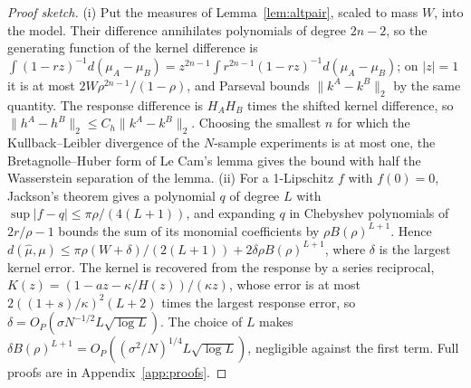 \documentclass[12pt]{article}
\theoremstyle{definition}
\theoremstyle{remark}
\begin{document}
\begin{proof}[Proof sketch]
(i) Put the measures of Lemma~\ref{lem:altpair}, scaled to mass $W$, into the model. Their difference annihilates polynomials of degree $2n-2$, so the generating function of the kernel difference is $\int(1-rz)^{-1}d(\mu_A-\mu_B)=z^{2n-1}\int r^{2n-1}(1-rz)^{-1}d(\mu_A-\mu_B)$; on $|z|=1$ it is at most $2W\rho^{2n-1}/(1-\rho)$, and Parseval bounds $\|k^A-k^B\|_2$ by the same quantity. The response difference is $H_AH_B$ times the shifted kernel difference, so $\|h^A-h^B\|_2\le C_h\|k^A-k^B\|_2$. Choosing the smallest $n$ for which the Kullback--Leibler divergence of the $N$-sample experiments is at most one, the Bretagnolle--Huber form of Le Cam's lemma gives the bound with half the Wasserstein separation of the lemma. (ii) For a 1-Lipschitz $f$ with $f(0)=0$, Jackson's theorem gives a polynomial $q$ of degree $L$ with $\sup|f-q|\le\pi\rho/(4(L+1))$, and expanding $q$ in Chebyshev polynomials of $2r/\rho-1$ bounds the sum of its monomial coefficients by $\rho B(\rho)^{L+1}$. Hence $d(\hat\mu,\mu)\le\pi\rho(W+\delta)/(2(L+1))+2\delta\rho B(\rho)^{L+1}$, where $\delta$ is the largest kernel error. The kernel is recovered from the response by a series reciprocal, $K(z)=(1-az-\kappa/H(z))/(\kappa z)$, whose error is at most $2((1+s)/\kappa)^2(L+2)$ times the largest response error, so $\delta=O_P(\sigma N^{-1/2}L\sqrt{\log L})$. The choice of $L$ makes $\delta B(\rho)^{L+1}=O_P((\sigma^2/N)^{1/4}L\sqrt{\log L})$, negligible against the first term. Full proofs are in Appendix~\ref{app:proofs}.
\end{proof}
\end{document}
